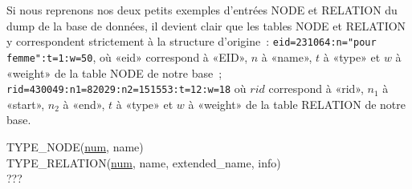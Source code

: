 \documentclass[a4paper,11pt,french]{article}
\begin{document}
Si nous reprenons nos deux petits exemples d'entrées NODE et RELATION du dump de la base de données, il devient clair que les tables NODE et
RELATION y correspondent strictement à la structure d'origine~: \verb!eid=231064:n="pour femme":t=1:w=50!, où «eid» correspond à «EID», $n$ à
«name», $t$ à «type» et $w$ à «weight» de la table NODE de notre base~; \verb!rid=430049:n1=82029:n2=151553:t=12:w=18! où $rid$ correspond à «rid»,
$n_1$ à «start», $n_2$ à «end», $t$ à «type» et $w$ à «weight» de la table RELATION de notre base.



TYPE\_NODE(\underline{num}, name) \\



TYPE\_RELATION(\underline{num}, name, extended\_name, info) \\

???


\end{document}
